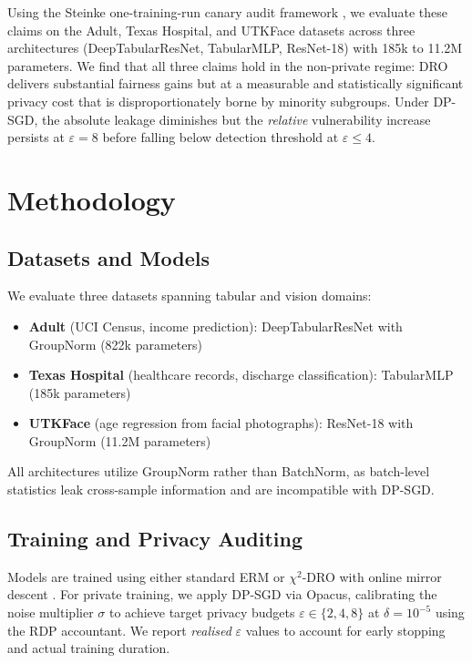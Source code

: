 \documentclass[11pt, a4paper]{article}
\begin{document}
Using the Steinke one-training-run canary audit framework \cite{steinke2023}, we evaluate these claims on the Adult, Texas Hospital, and UTKFace datasets across three architectures (DeepTabularResNet, TabularMLP, ResNet-18) with 185k to 11.2M parameters. We find that all three claims hold in the non-private regime: DRO delivers substantial fairness gains but at a measurable and statistically significant privacy cost that is disproportionately borne by minority subgroups. Under DP-SGD, the absolute leakage diminishes but the \textit{relative} vulnerability increase persists at $\varepsilon = 8$ before falling below detection threshold at $\varepsilon \le 4$.

\section{Methodology}

\subsection{Datasets and Models}

We evaluate three datasets spanning tabular and vision domains:
\begin{itemize}
    \item \textbf{Adult} (UCI Census, income prediction): DeepTabularResNet with GroupNorm (822k parameters)
    \item \textbf{Texas Hospital} (healthcare records, discharge classification): TabularMLP (185k parameters)
    \item \textbf{UTKFace} (age regression from facial photographs): ResNet-18 with GroupNorm (11.2M parameters)
\end{itemize}

All architectures utilize GroupNorm rather than BatchNorm, as batch-level statistics leak cross-sample information and are incompatible with DP-SGD.

\subsection{Training and Privacy Auditing}

Models are trained using either standard ERM or $\chi^2$-DRO with online mirror descent \cite{hashimoto2018}. For private training, we apply DP-SGD via Opacus, calibrating the noise multiplier $\sigma$ to achieve target privacy budgets $\varepsilon \in \{2, 4, 8\}$ at $\delta = 10^{-5}$ using the RDP accountant. We report \textit{realised} $\varepsilon$ values to account for early stopping and actual training duration.
\end{document}
